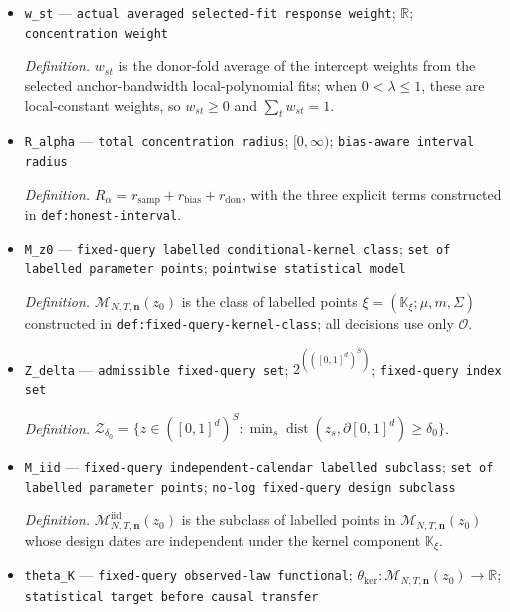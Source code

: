 \documentclass{article}
\begin{document}
\begin{itemize}
  \item \texttt{w\_\allowbreak{}st} --- \texttt{actual averaged selected-\allowbreak{}fit response weight}; \(\mathbb R\); \texttt{concentration weight}
  \par\smallskip\noindent\emph{Definition.} \(w_{st}\) is the donor-fold average of the intercept weights from the selected anchor-bandwidth local-polynomial fits; when \(0<\lambda\le1\), these are local-constant weights, so \(w_{st}\ge0\) and \(\sum_t w_{st}=1\).
  \item \texttt{R\_\allowbreak{}alpha} --- \texttt{total concentration radius}; \([0,\infty)\); \texttt{bias-\allowbreak{}aware interval radius}
  \par\smallskip\noindent\emph{Definition.} \(R_\alpha=r_{\mathrm{samp}}+r_{\mathrm{bias}}+r_{\mathrm{don}}\), with the three explicit terms constructed in \texttt{def:honest-interval}.
  \item \texttt{M\_\allowbreak{}z0} --- \texttt{fixed-\allowbreak{}query labelled conditional-\allowbreak{}kernel class}; \texttt{set of labelled parameter points}; \texttt{pointwise statistical model}
  \par\smallskip\noindent\emph{Definition.} \(\mathcal M_{N,T,\mathbf n}(z_0)\) is the class of labelled points \(\xi=(\mathbb K_\xi;\mu,m,\Sigma)\) constructed in \texttt{def:fixed-query-kernel-class}; all decisions use only \(\mathcal O\).
  \item \texttt{Z\_\allowbreak{}delta} --- \texttt{admissible fixed-\allowbreak{}query set}; \(2^{(([0,1]^d)^S)}\); \texttt{fixed-\allowbreak{}query index set}
  \par\smallskip\noindent\emph{Definition.} \(\mathcal Z_{\delta_0}=\{z\in([0,1]^d)^S:\min_s\operatorname{dist}(z_s,\partial[0,1]^d)\ge\delta_0\}\).
  \item \texttt{M\_\allowbreak{}iid} --- \texttt{fixed-\allowbreak{}query independent-\allowbreak{}calendar labelled subclass}; \texttt{set of labelled parameter points}; \texttt{no-\allowbreak{}log fixed-\allowbreak{}query design subclass}
  \par\smallskip\noindent\emph{Definition.} \(\mathcal M^{\mathrm{iid}}_{N,T,\mathbf n}(z_0)\) is the subclass of labelled points in \(\mathcal M_{N,T,\mathbf n}(z_0)\) whose design dates are independent under the kernel component \(\mathbb K_\xi\).
  \item \texttt{theta\_\allowbreak{}K} --- \texttt{fixed-\allowbreak{}query observed-\allowbreak{}law functional}; \(\theta_{\mathrm{ker}}:\mathcal M_{N,T,\mathbf n}(z_0)\to\mathbb R\); \texttt{statistical target before causal transfer}

\end{itemize}
\end{document}
